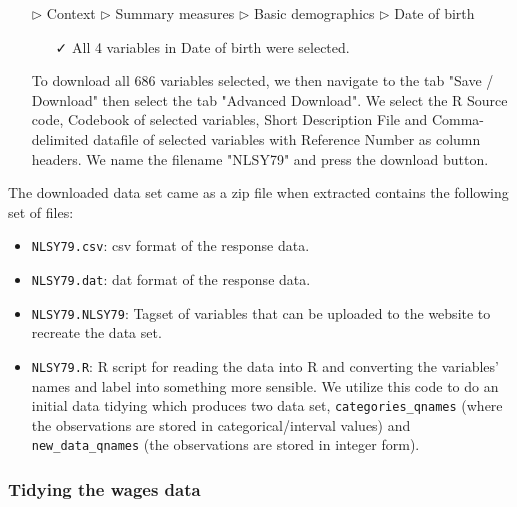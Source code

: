 \documentclass{article}
\begin{document}
\begin{tcolorbox}[label="box:data", title=Navigating the data source to download the raw data]
\begin{itemize}
\begin{itemize}
\item[$\triangleright$] Context $\triangleright$ Summary measures $\triangleright$ Basic demographics $\triangleright$ Date of birth
\begin{itemize}
\item[\faCheck] All 4 variables in Date of birth were selected. 
\end{itemize}
\end{itemize}
\end{itemize}
\begin{itemize}
\item[\faCloudDownload] To download all 686 variables selected, we then navigate to the tab "Save / Download" then select the tab "Advanced Download". We select the R Source code, Codebook of selected variables, Short Description File and Comma-delimited datafile of selected variables with Reference Number as column headers. We name the filename "NLSY79" and press the download button.
\end{itemize}

\end{tcolorbox}

The downloaded data set came as a zip file when extracted contains the following set of files:

\begin{itemize}
\tightlist
\item
  \texttt{NLSY79.csv}: csv format of the response data.
\item
  \texttt{NLSY79.dat}: dat format of the response data.
\item
  \texttt{NLSY79.NLSY79}: Tagset of variables that can be uploaded to the website to recreate the data set.
\item
  \texttt{NLSY79.R}: R script for reading the data into R and converting the variables' names and label into something more sensible. We utilize this code to do an initial data tidying which produces two data set, \texttt{categories\_qnames} (where the observations are stored in categorical/interval values) and \texttt{new\_data\_qnames} (the observations are stored in integer form).
\end{itemize}

\hypertarget{tidywages}{%
\subsubsection{Tidying the wages data}\label{tidywages}}
\end{document}
